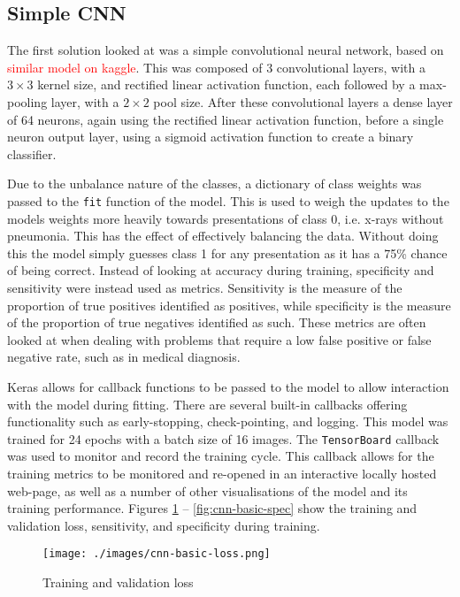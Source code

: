 \documentclass[12pt,a4paper,titlepage,twoside]{report}
\newcommand\todo[1]{\textcolor{red}{#1}}
\begin{document}
	\subsection{Simple CNN}
	The first solution looked at was a simple convolutional neural network, based on \todo{similar model on kaggle}. This was composed of 3 convolutional layers, with a $3\times3$ kernel size, and rectified linear activation function, each followed by a max-pooling layer, with a $2\times2$ pool size. After these convolutional layers a dense layer of 64 neurons, again using the rectified linear activation function, before a single neuron output layer, using a sigmoid activation function to create a binary classifier. \par
	Due to the unbalance nature of the classes, a dictionary of class weights was passed to the \texttt{fit} function of the model. This is used to weigh the updates to the models weights more heavily towards presentations of class 0, i.e. x-rays without pneumonia. This has the effect of effectively balancing the data. Without doing this the model simply guesses class 1 for any presentation as it has a 75\% chance of being correct. Instead of looking at accuracy during training, specificity and sensitivity were instead used as metrics. Sensitivity is the measure of the proportion of true positives identified as positives, while specificity is the measure of the proportion of true negatives identified as such. These metrics are often looked at when dealing with problems that require a low false positive or false negative rate, such as in medical diagnosis. \par
	Keras allows for callback functions to be passed to the model to allow interaction with the model during fitting. There are several built-in callbacks offering functionality such as early-stopping, check-pointing, and logging. This model was trained for 24 epochs with a batch size of 16 images. The \texttt{TensorBoard} callback was used to monitor and record the training cycle. This callback allows for the training metrics to be monitored and re-opened in an interactive locally hosted web-page, as well as a number of other visualisations of the model and its training performance. Figures \ref{fig:cnn-basic-loss} -- \ref{fig:cnn-basic-spec} show the training and validation loss, sensitivity, and specificity during training. 
	
	\begin{figure}[t]
		\centering
		\texttt{[image: ./images/cnn-basic-loss.png]}
		\caption{Training and validation loss}
		\label{fig:cnn-basic-loss}
	\end{figure}
	
\end{document}
